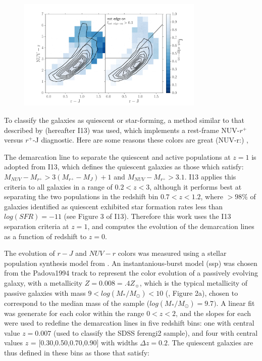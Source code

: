 \documentclass[useAMS,usenatbib]{mn2e}
\begin{document}
\begin{figure}
\centering
\includegraphics[width=3.5in,trim={1cm 0cm 0cm 0cm},clip]{figures/edgeon_colorcolor.pdf}
\caption{}
\label{fig:edgeon}
\end{figure}
To classify the galaxies as quiescent or star-forming, a method similar to that described by \citet{Ilbert2013} (hereafter I13) was used, which implements a rest-frame NUV-$r^{+}$ versus $r^{+}$-J diagnostic. Here are some reasons these colors are great (NUV-r:) \citep{Arnouts2007a,Salim2005a,Wyder2007},\citep{Martin2007}

The demarcation line to separate the quiescent and active populations at $z=1$ is adopted from I13, which defines the quiescent galaxies as those which satisfy: $M_{NUV}-M_{r^{+}} > 3(M_{r^{+}}-M_{J})+1$ and $M_{NUV}-M_{r^{+}} > 3.1$. I13 applies this criteria to all galaxies in a range of $0.2<z<3$, although it performs best at separating the two populations in the redshift bin $0.7<z<1.2$, where $>98\%$ of galaxies identified as quiescent exhibited star formation rates less than $log(SFR) = -11$ (see Figure 3 of I13). Therefore this work uses the I13 separation criteria at $z=1$, and computes the evolution of the demarcation lines as a function of redshift to $z=0$. 

The evolution of $r-J$ and $NUV-r$ colors was measured using a stellar population synthesis model from \citet{Bruzual2003}. An instantanious-burst model (ssp) was chosen from the Padova1994 track to represent the color evolution of a passively evolving galaxy, with a metallicity $Z=0.008=.4Z_{\sun}$, which is the typical metallicity of passive galaxies with mass $9 < log(M_{*}/M_{\odot}) < 10$ (\citet{Peng2015}, Figure 2a), chosen to correspond to the median mass of the sample ($log(M_{*}/M_{\odot})=9.7)$. A linear fit was geenerate for each color within the range $0<z<2$, and the slopes for each were used to redefine the demarcation lines in five redshift bins: one with central value $z=0.007$ (used to classify the SDSS ferengi2 sample), and four with central values $z$ = [0.30,0.50,0.70,0.90] with widths $\Delta z=0.2$. The quiescent galaxies are thus defined in these bins as those that satisfy:
\end{document}
